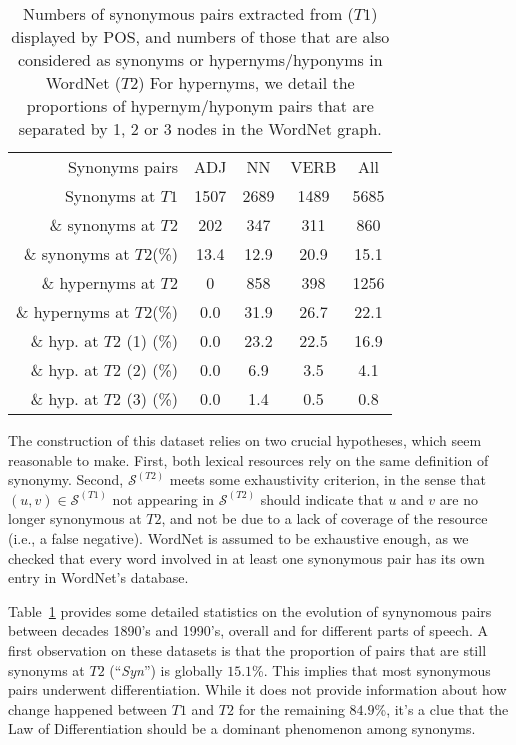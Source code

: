 \documentclass[11pt]{article}
\newcommand{\synonymsSet}{\mathcal{S}}
\begin{document}
\begin{table}[ht]
\centering
\small
\begin{tabular}{r|cccc}\toprule
     Synonyms pairs &ADJ &NN &VERB &All \\
     \cmidrule{1-5}
     Synonyms at $T1$ & 1507 &2689 & 1489 &5685\\\cmidrule{1-5}
     \& synonyms at $T2$ & 202 & 347 & 311 & 860\\
     \& synonyms at $T2$(\%) & 13.4 & 12.9 & 20.9 & 15.1\\
     \cmidrule{1-5}
     \& hypernyms at $T2$ & 0 & 858 & 398 & 1256\\
     \& hypernyms at $T2$(\%) & 0.0 & 31.9 & 26.7 & 22.1\\
     \& hyp. at $T2$ (1) (\%) & 0.0 & 23.2 & 22.5 & 16.9\\
     \& hyp. at $T2$ (2) (\%) & 0.0 & 6.9 & 3.5 & 4.1\\
     \& hyp. at $T2$ (3) (\%) & 0.0 & 1.4 & 0.5 & 0.8\\
     \bottomrule
\end{tabular}
\caption{\label{datadescr} Numbers of synonymous pairs extracted from \citet{fernald1896english} ($T1$) displayed by POS, and numbers of those that are also considered as synonyms or hypernyms/hyponyms in WordNet ($T2$) For hypernyms, we detail the proportions of hypernym/hyponym pairs that are separated by 1, 2 or 3 nodes in the WordNet graph.}
\end{table}


The construction of this dataset relies on two crucial hypotheses, which seem reasonable to make. First, both lexical resources rely on the same definition of synonymy. Second, $\synonymsSet^{(T2)}$ meets some exhaustivity criterion, in the sense that $(u,v)\in\synonymsSet^{(T1)}$ not appearing in $\synonymsSet^{(T2)}$ should indicate that $u$ and $v$ are no longer synonymous at $T2$, and not be due to a lack of coverage of the resource (i.e., a false negative). WordNet is assumed to be exhaustive enough, as we checked that every word involved in at least one synonymous pair has its own entry in WordNet's database.

Table~\ref{datadescr} provides some detailed statistics on the evolution of synynomous pairs between decades 1890's and 1990's, overall and for different parts of speech. A first observation on these datasets is that the proportion of pairs that are still synonyms at $T2$ (``\textit{Syn}'') is globally $15.1$\%. This implies that most synonymous pairs underwent differentiation. While it does not provide information about how change happened between $T1$ and $T2$ for the remaining $84.9$\%, it's a clue that the Law of Differentiation should be a dominant phenomenon among synonyms. 
\end{document}

